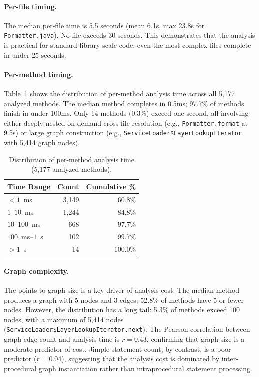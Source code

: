 \paragraph{Per-file timing.}
The median per-file time is 5.5 seconds (mean 6.1s, max 23.8s for \texttt{Formatter.java}).
No file exceeds 30 seconds.
This demonstrates that the analysis is practical for standard-library-scale code: even the most complex files complete in under 25 seconds.

\paragraph{Per-method timing.}
Table~\ref{tab:method-timing} shows the distribution of per-method analysis time across all 5,177 analyzed methods.
The median method completes in 0.5ms; 97.7\% of methods finish in under 100ms.
Only 14 methods (0.3\%) exceed one second, all involving either deeply nested on-demand cross-file resolution (e.g., \texttt{Formatter.format} at 9.5s) or large graph construction (e.g., \texttt{ServiceLoader\$LayerLookupIterator} with 5,414 graph nodes).

\begin{table}[h]
\centering
\caption{Distribution of per-method analysis time (5,177 analyzed methods).}
\label{tab:method-timing}
\begin{tabular}{lrr}
\toprule
\textbf{Time Range} & \textbf{Count} & \textbf{Cumulative \%} \\
\midrule
$< 1$~ms          & 3,149 & 60.8\% \\
$1$--$10$~ms      & 1,244 & 84.8\% \\
$10$--$100$~ms    &   668 & 97.7\% \\
$100$~ms--$1$~s   &   102 & 99.7\% \\
$> 1$~s           &    14 & 100.0\% \\
\bottomrule
\end{tabular}
\end{table}

\paragraph{Graph complexity.}
The points-to graph size is a key driver of analysis cost.
The median method produces a graph with 5 nodes and 3 edges; 52.8\% of methods have 5 or fewer nodes.
However, the distribution has a long tail: 5.3\% of methods exceed 100 nodes, with a maximum of 5,414 nodes (\texttt{ServiceLoader\$LayerLookupIterator.next}).
The Pearson correlation between graph edge count and analysis time is $r = 0.43$, confirming that graph size is a moderate predictor of cost.
Jimple statement count, by contrast, is a poor predictor ($r = 0.04$), suggesting that the analysis cost is dominated by inter-procedural graph instantiation rather than intraprocedural statement processing.

